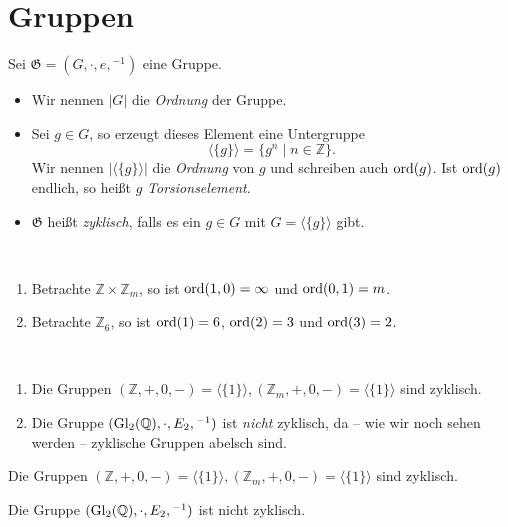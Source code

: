\section{Gruppen}

\begin{definition}
    Sei $\mathfrak{G} = (G, \cdot, e, {}^{-1})$ eine Gruppe.
    \begin{itemize}
        \item Wir nennen $|G|$ die \emph{Ordnung} der Gruppe.
        \item Sei $g \in G$, so erzeugt dieses Element eine Untergruppe
        $$ \langle \{ g \} \rangle = \{ g^n \mid n \in \mathbb{Z} \}. $$
        Wir nennen $|\langle\{g\}\rangle|$ die \emph{Ordnung} von $g$ und schreiben auch $\operatorname{ord}(g)$. Ist $\operatorname{ord}(g)$ endlich, so heißt $g$ \emph{Torsionselement}.
        \item $\mathfrak{G}$ heißt \emph{zyklisch}, falls es ein $g \in G$ mit $G = \langle\{g\}\rangle$ gibt.
    \end{itemize}
\end{definition}

\begin{example} {\ }
    \begin{enumerate}
        \item Betrachte $\mathbb{Z} \times \mathbb{Z}_m$, so ist $\operatorname{ord}(1,0) = \infty$ und $\operatorname{ord}(0,1) = m$.
        \item Betrachte $\mathbb{Z}_6$, so ist $\operatorname{ord}(1) = 6$, $\operatorname{ord}(2) = 3$ und $\operatorname{ord}(3) = 2$.
    \end{enumerate}
\end{example}

\begin{example} {\ }
    \begin{enumerate}
        \item Die Gruppen $(\mathbb{Z}, +, 0, -) = \langle\{1\}\rangle, (\mathbb{Z}_m, +, 0, -) = \langle\{1\}\rangle$ sind zyklisch.
        \item Die Gruppe $(\operatorname{Gl}_2(\mathbb{Q}), \cdot, E_2, {}^{-1})$ ist \emph{nicht} zyklisch, da -- wie wir noch sehen werden -- zyklische Gruppen abelsch sind.
    \end{enumerate}
\end{example}

\begin{example}
    Die Gruppen $(\mathbb{Z}, +, 0, -) = \langle\{1\}\rangle, (\mathbb{Z}_m, +, 0, -) = \langle\{1\}\rangle$ sind zyklisch.

    Die Gruppe $(\operatorname{Gl}_2(\mathbb{Q}), \cdot, E_2, {}^{-1})$ ist nicht zyklisch.
\end{example}

